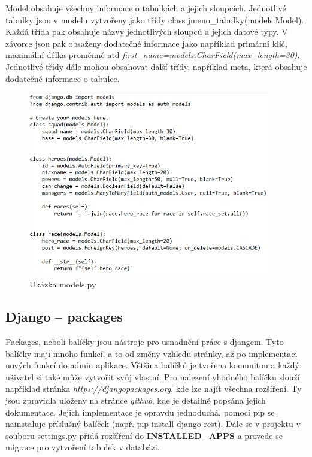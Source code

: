 Model obsahuje všechny informace o tabulkách a jejich
sloupcích. Jednotlivé tabulky jsou v modelu vytvořeny jako třídy class
jmeno\_tabulky(models.Model). Každá třída pak obsahuje názvy
jednotlivých sloupců a jejich datové typy. V závorce jsou pak obsaženy
dodatečné informace jako například primární klíč, maximální délka
proměnné atd
\textit{first\_name=models.CharField(max\_length=30)}. Jednotlivé
třídy dále mohou obsahovat další třídy, například meta, která obsahuje
dodatečné informace o tabulce.

\vspace{15px}

\begin{figure}[H] \centering
    \includegraphics[width=300pt]{./pictures/2-model-example.png}
    \caption[Model příklad]{Ukázka models.py \cite{}}
	\label{fig:Ukázka models.py}                                
\end{figure}

\newpage

\subsection{Django – packages}

Packages, neboli balíčky jsou nástroje pro usnadnění práce s
djangem. Tyto balíčky mají mnoho funkcí, a to od změny vzhledu
stránky, až po implementaci nových funkcí do admin aplikace. Většina
balíčků je tvořena komunitou a každý uživatel si také může vytvořit
svůj vlastní. Pro nalezení vhodného balíčku slouží například stránka
\textit{https://djangopackages.org}, kde lze najít všechna
rozšíření. Ty jsou zpravidla uloženy na stránce \textit{github}, kde
je detailně popsána jejich dokumentace. Jejich implementace je opravdu
jednoduchá, pomocí pip se nainstaluje příslušný balíček (např. pip
install django-rest). Dále se v projektu v souboru settings.py přidá
rozšíření do \textbf{INSTALLED\_APPS} a provede se migrace pro
vytvoření tabulek v databázi.

